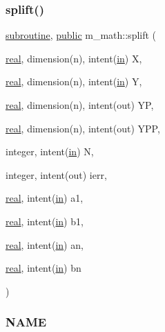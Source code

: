 \subsubsection{\texorpdfstring{splift()}{splift()}}
{\footnotesize\ttfamily \hyperlink{M__stopwatch_83_8txt_acfbcff50169d691ff02d4a123ed70482}{subroutine}, \hyperlink{M__stopwatch_83_8txt_a2f74811300c361e53b430611a7d1769f}{public} m\+\_\+math\+::splift (\begin{DoxyParamCaption}\item[{\hyperlink{read__watch_83_8txt_abdb62bde002f38ef75f810d3a905a823}{real}, dimension(n), intent(\hyperlink{M__journal_83_8txt_afce72651d1eed785a2132bee863b2f38}{in})}]{X,  }\item[{\hyperlink{read__watch_83_8txt_abdb62bde002f38ef75f810d3a905a823}{real}, dimension(n), intent(\hyperlink{M__journal_83_8txt_afce72651d1eed785a2132bee863b2f38}{in})}]{Y,  }\item[{\hyperlink{read__watch_83_8txt_abdb62bde002f38ef75f810d3a905a823}{real}, dimension(n), intent(out)}]{YP,  }\item[{\hyperlink{read__watch_83_8txt_abdb62bde002f38ef75f810d3a905a823}{real}, dimension(n), intent(out)}]{Y\+PP,  }\item[{integer, intent(\hyperlink{M__journal_83_8txt_afce72651d1eed785a2132bee863b2f38}{in})}]{N,  }\item[{integer, intent(out)}]{ierr,  }\item[{\hyperlink{read__watch_83_8txt_abdb62bde002f38ef75f810d3a905a823}{real}, intent(\hyperlink{M__journal_83_8txt_afce72651d1eed785a2132bee863b2f38}{in})}]{a1,  }\item[{\hyperlink{read__watch_83_8txt_abdb62bde002f38ef75f810d3a905a823}{real}, intent(\hyperlink{M__journal_83_8txt_afce72651d1eed785a2132bee863b2f38}{in})}]{b1,  }\item[{\hyperlink{read__watch_83_8txt_abdb62bde002f38ef75f810d3a905a823}{real}, intent(\hyperlink{M__journal_83_8txt_afce72651d1eed785a2132bee863b2f38}{in})}]{an,  }\item[{\hyperlink{read__watch_83_8txt_abdb62bde002f38ef75f810d3a905a823}{real}, intent(\hyperlink{M__journal_83_8txt_afce72651d1eed785a2132bee863b2f38}{in})}]{bn }\end{DoxyParamCaption})}



\subsubsection*{N\+A\+ME}

